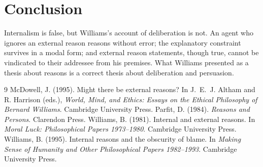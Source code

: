 \documentclass{situationist-preprint}
\begin{document}
\section{Conclusion}

Internalism is false, but Williams's account of deliberation is not. An agent who ignores an external reason reasons without error; the explanatory constraint survives in a modal form; and external reason statements, though true, cannot be vindicated to their addressee from his premises. What Williams presented as a thesis about reasons is a correct thesis about deliberation and persuasion.

\begin{thebibliography}{9}\small
{} McDowell, J. (1995). Might there be external reasons? In J.~E.~J. Altham and R. Harrison (eds.), \emph{World, Mind, and Ethics: Essays on the Ethical Philosophy of Bernard Williams}. Cambridge University Press.
 Parfit, D. (1984). \emph{Reasons and Persons}. Clarendon Press.
 Williams, B. (1981). Internal and external reasons. In \emph{Moral Luck: Philosophical Papers 1973--1980}. Cambridge University Press.
 Williams, B. (1995). Internal reasons and the obscurity of blame. In \emph{Making Sense of Humanity and Other Philosophical Papers 1982--1993}. Cambridge University Press.
\end{thebibliography}
\end{document}
